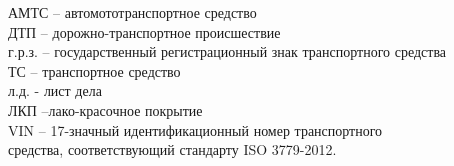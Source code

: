 \noindent АМТС – автомототранспортное средство\\
ДТП – дорожно-транспортное происшествие\\
г.р.з. – государственный регистрационный знак транспортного средства\\
ТС – транспортное средство\\
л.д. - лист дела\\
ЛКП –лако-красочное покрытие\\
VIN – 17-значный идентификационный номер транспортного\\ средства, соответствующий стандарту ISO 3779-2012. 